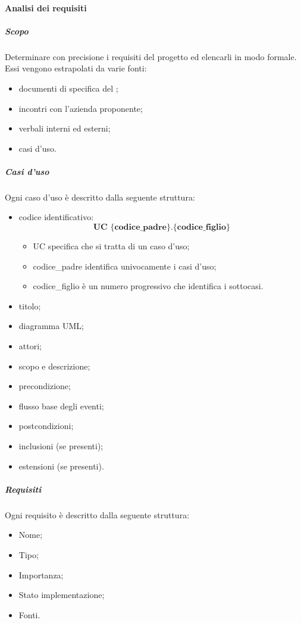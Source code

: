 \paragraph{Analisi dei requisiti}
\subparagraph{Scopo}\Spazio
Determinare con precisione i requisiti del progetto ed elencarli in modo formale. Essi vengono estrapolati da varie fonti:
\begin{itemize}
	\item documenti di specifica del ;
	\item incontri con l'azienda proponente;
	\item verbali interni ed esterni;
	\item casi d'uso.
\end{itemize}
\subparagraph{Casi d'uso}\Spazio
Ogni caso d'uso è descritto dalla seguente struttura:
\begin{itemize}
	\item codice identificativo: $$ \textbf{UC \{codice\_padre\}.\{codice\_figlio\}  } $$
		\begin{itemize}
				\item UC specifica che si tratta di un caso d'uso;
				\item codice\_padre identifica univocamente i casi d'uso;
				\item codice\_figlio è un numero progressivo che identifica i sottocasi.
		\end{itemize}
	\item titolo;
	\item diagramma UML;
	\item attori;
	\item scopo e descrizione;
	\item precondizione;
	\item flusso base degli eventi;
	\item postcondizioni;
	\item inclusioni (se presenti);
	\item estensioni (se presenti).
\end{itemize}
\subparagraph{Requisiti}\Spazio
Ogni requisito è descritto dalla seguente struttura:
\begin{itemize}
	\item Nome;
	\item Tipo;
	\item Importanza;
	\item Stato implementazione;
	\item Fonti.
\end{itemize}


